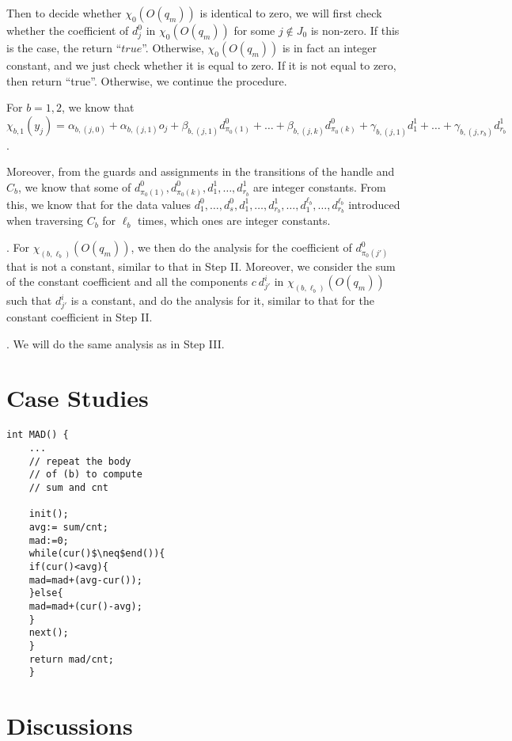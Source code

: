 \documentclass[runningheads,a4paper]{llncs}
\begin{document}
Then to decide whether $\chi_0(O(q_m))$ is identical to zero, we will first check whether the coefficient of $d^0_j$ in $\chi_0(O(q_m))$ for some $j \not \in J_0$ is non-zero. If this is the case, the return ``$true$''. Otherwise, $\chi_0(O(q_m))$ is in fact an integer constant, and we just check whether it is equal to zero. If it is not equal to zero, then return ``true''. Otherwise, we continue the procedure.

For $b=1,2$, we know that $\chi_{b,1}(y_j) = \alpha_{b,(j,0)} + \alpha_{b,(j,1)} o_j + \beta_{b,(j,1)} d^0_{\pi_0(1)} + \dots + \beta_{b,(j,k)} d^0_{\pi_0(k)} + \gamma_{b,(j,1)} d^1_1 +\dots + \gamma_{b,(j,r_b)} d^1_{r_b}$.

Moreover, from the guards and assignments in the transitions of the handle and $C_b$, we know that some of $d^0_{\pi_0(1)}, d^0_{\pi_0(k)}, d^1_1,\dots, d^1_{r_b}$ are integer constants. From this, we know that for the data values $d^0_1,\dots, d^0_s, d^1_1,\dots, d^1_{r_b}, \dots, d^{\ell_b}_1,\dots, d^{\ell_b}_{r_b}$ introduced when traversing $C_b$ for $\ell_b$ times, which ones are integer constants.

\smallskip

. For $\chi_{(b,\ell_b)}(O(q_m))$, we then do the analysis for the coefficient of $d^0_{\pi_0(j')}$ that is not a constant, similar to that in Step II.  Moreover, we consider the sum of the constant coefficient and all the components $c\ d^{i}_{j'}$ in  $\chi_{(b,\ell_b)}(O(q_m))$ such that $d^i_{j'}$ is a constant, and do the analysis for it, similar to that for the constant coefficient in Step II.

\smallskip

. We will do the same analysis as in Step III.




\section{Case Studies}

	\begin{lstlisting}[mathescape=true]
	int MAD() {
	...
	// repeat the body  
	// of (b) to compute
	// sum and cnt
	
	init();
	avg:= sum/cnt;
	mad:=0;
	while(cur()$\neq$end()){
	if(cur()<avg){
	mad=mad+(avg-cur());
	}else{
	mad=mad+(cur()-avg);
	}
	next();
	}
	return mad/cnt;
	}
	\end{lstlisting}
	
\section{Discussions}
\end{document}
